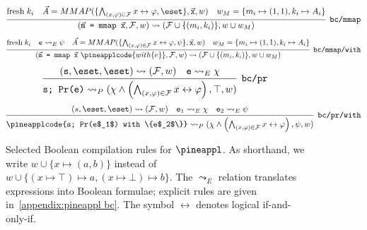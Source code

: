 \begin{figure}
\begin{mdframed}
  {\footnotesize
  \begin{align*}
    \infer[\texttt{bc/mmap}]
    {
      (\vec{\texttt{m}}\texttt{ = mmap }\vec{\texttt{x}}, \mathcal{F}, w) \leadsto
      (\mathcal{F} \cup \{(m_i, k_i) \}, w \cup w_{M})
    }
    {
      \mathrm{fresh} \; k_i
      & \vec A = MMAP(\{\bigwedge_{(x, \varphi) \in \mathcal{F}} x \leftrightarrow \varphi, \eset\}, \vec{\texttt{x}}, w)
      &
      w_{M} = \{m_i \mapsto (1,1), k_i \mapsto A_i \}
    }
  \end{align*}
  \begin{align*}
    \infer[\texttt{bc/mmap/with}]
    {
      (\vec{\texttt{m}}\texttt{ = mmap }\vec{\texttt{x}} \ \pineapplcode{ with \{e\}}, \mathcal{F}, w) \leadsto
      (\mathcal{F} \cup \{(m_i, k_i) \}, w \cup w_{M})
    }
    {
      \mathrm{fresh} \; k_i
      & \texttt e \leadsto_E \psi
      & \vec A = MMAP(\{\bigwedge_{(x, \varphi) \in \mathcal{F}} x \leftrightarrow \varphi, \psi\}, \vec{\texttt{x}}, w)
      &
      w_{M} = \{m_i \mapsto (1,1), k_i \mapsto A_i \}
    }
  \end{align*}
  \begin{align*}
    \infer[\texttt{bc/pr}]
    {
      \texttt{s; Pr(e)} \leadsto_P (\chi \land \left( \bigwedge_{(x, \varphi) \in \mathcal{F}} x \leftrightarrow \varphi \right), \top,w)
    }
    {
      (\texttt{s}, \eset, \eset) \leadsto (\mathcal F, w)
      &
      \texttt{e} \leadsto_E \chi
    }
  \end{align*}
  \begin{align*}
    \infer[\texttt{bc/pr/with}]
    {
      \pineapplcode{s; Pr(e$_1$) with \{e$_2$\}} \leadsto_P (\chi \land \left(\bigwedge_{(x, \varphi) \in \mathcal{F}} x \leftrightarrow \varphi \right), \psi, w)
    }
    {
      (s, \eset, \eset) \leadsto (\mathcal F, w)
      &
      \texttt{e$_1$} \leadsto_E \chi
      &
      \texttt{e$_2$} \leadsto_E \psi
    }
  \end{align*}
  }
\end{mdframed}
\caption{Selected Boolean compilation rules for $\pineappl$. As shorthand, we write
$w \cup \{x \mapsto (a, b)\}$ instead of $w \cup \{(x \mapsto \top) \mapsto a, (x \mapsto \bot) \mapsto b\}$.
The $\leadsto_E$ relation translates expressions into Boolean formulae; explicit rules are given in~\cref{appendix:pineappl bc}. The symbol $\leftrightarrow$ denotes logical if-and-only-if.}
\label{fig:pineappl-compl}
\end{figure}

